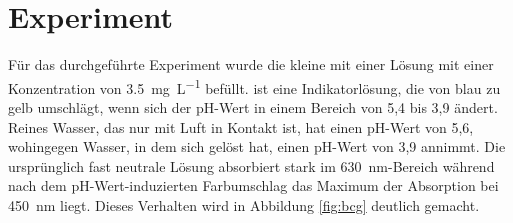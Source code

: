 


\section{\COTm Experiment}
\label{sec:cot}
Für das durchgeführte Experiment wurde die kleine \HSC mit einer \BCG Lösung mit einer Konzentration von \SI[round-precision=1]{3,5}{\milli\gram\per\liter} befüllt. 
\BCG ist eine Indikatorlösung, die von blau zu gelb umschlägt, wenn sich der pH-Wert in einem Bereich von 5,4 bis 3,9 ändert. Reines Wasser, das nur mit Luft in Kontakt ist, hat einen pH-Wert von 5,6, wohingegen Wasser, in dem sich \COT gelöst hat, einen pH-Wert von 3,9 annimmt. Die ursprünglich fast neutrale Lösung absorbiert stark im \SI{630}{\nano\meter}-Bereich während nach dem pH-Wert-induzierten Farbumschlag das Maximum der Absorption bei \SI{450}{\nano\meter} liegt. Dieses Verhalten wird in Abbildung \ref{fig:bcg} deutlich gemacht.

